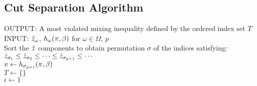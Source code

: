 \documentclass[msom]{oo}
\begin{document}

 


\newpage
\bigskip
\begin{APPENDICES}
\small
\section{Cut Separation Algorithm}
\label{APP1}
\begin{algorithm}[ht]
\SetAlgoLined
\linespread{1.15}\selectfont
{OUTPUT: A most violated mixing inequality defined by the ordered index set $T$ } \\
INPUT: $\hat{z}_{\omega}$, %
$h_{\omega}(\pi,\beta)$ for $\omega \in \Omega$, $p$
\\
Sort the $\hat{z}$ components to obtain permutation $\sigma$ of the indices satisfying:
$\hat{z}_{\sigma_1} \leq \hat{z}_{\sigma_2} \leq \cdots \leq \hat{z}_{\sigma_{p+1}} \leq \cdots$ \\
$v \gets h_{\sigma_{p+1}}(\pi,\beta)$ \\
$T \gets \{ \}$ \\
$ i \gets 1$ \\
\caption{Finding a most violated inequality of the form \eqref{eq:mixed}.}\label{alg:mostviolated}
\end{algorithm}
\end{APPENDICES}
\end{document}
